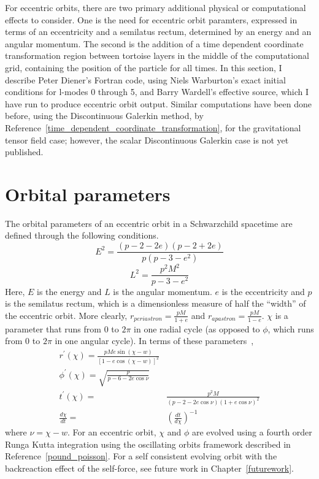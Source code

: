 For eccentric orbits, there are two primary additional physical or computational effects to consider. One is the need for eccentric orbit paramters, expressed in terms of an eccentricity and a semilatus rectum, determined by an energy and an angular momentum. The second is the addition of a time dependent coordinate transformation region between tortoise layers in the middle of the computational grid, containing the position of the particle for all times. In this section, I describe Peter Diener's Fortran code, using Niels Warburton's exact initial conditions for l-modes 0 through 5, and Barry Wardell's effective source, which I have run to produce eccentric orbit output. Similar computations have been done before, using the Discontinuous Galerkin method, by Reference~\ref{time_dependent_coordinate_transformation}, for the gravitational tensor field case; however, the scalar Discontinuous Galerkin case is not yet published.

\section{Orbital parameters}

The orbital parameters of an eccentric orbit in a Schwarzchild spacetime are defined through the following conditions.
\begin{equation}
  E^2=\frac{(p-2-2e)(p-2+2e)}{p(p-3-e^2)}
\end{equation}
\begin{equation}
  L^2=\frac{p^2M^2}{p-3-e^2}
\end{equation}
Here, $E$ is the energy and $L$ is the angular momentum. $e$ is the eccentricity and $p$ is the semilatus rectum, which is a dimensionless measure of half the ``width'' of the eccentric orbit. More clearly, $r_{periastron}=\frac{pM}{1+e}$ and $r_{apastron}=\frac{pM}{1-e}$. $\chi$ is a parameter that runs from $0$ to $2\pi$ in one radial cycle (as opposed to $\phi$, which runs from $0$ to $2\pi$ in one angular cycle). In terms of these parameters~\cite{pound_poisson},
\begin{eqnarray}
  r^\prime(\chi)=\frac{pMe\sin(\chi-w)}{[1-e\cos(\chi-w)]^2}\\
  \phi^\prime(\chi)=\sqrt{\frac{p}{p-6-2e\cos\nu}}\\
  t^\prime(\chi)=&\frac{p^2M}{(p-2-2e\cos\nu)(1+e\cos\nu)^2}\nonumber\\
  \frac{d\chi}{dt}=&(\frac{dt}{d\chi})^{-1}
\end{eqnarray}
where $\nu=\chi-w$. For an eccentric orbit, $\chi$ and $\phi$ are evolved using a fourth order Runga Kutta integration using the oscillating orbits framework described in Reference~\ref{pound_poisson}. For a self consistent evolving orbit with the backreaction effect of the self-force, see future work in Chapter~\ref{futurework}. 


